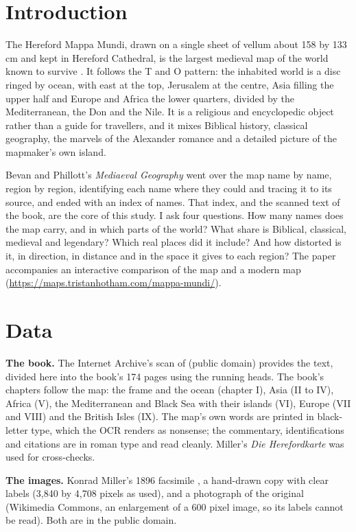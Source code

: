 \documentclass[11pt,a4paper]{article}
\begin{document}
\section{Introduction}
The Hereford Mappa Mundi, drawn on a single sheet of vellum about 158 by 133 cm and kept in Hereford Cathedral, is the largest medieval map of the world known to survive \citep{wiki}. It follows the T and O pattern: the inhabited world is a disc ringed by ocean, with east at the top, Jerusalem at the centre, Asia filling the upper half and Europe and Africa the lower quarters, divided by the Mediterranean, the Don and the Nile. It is a religious and encyclopedic object rather than a guide for travellers, and it mixes Biblical history, classical geography, the marvels of the Alexander romance and a detailed picture of the mapmaker's own island.

Bevan and Phillott's \textit{Mediaeval Geography} \citep{bevan} went over the map name by name, region by region, identifying each name where they could and tracing it to its source, and ended with an index of names. That index, and the scanned text of the book, are the core of this study. I ask four questions. How many names does the map carry, and in which parts of the world? What share is Biblical, classical, medieval and legendary? Which real places did it include? And how distorted is it, in direction, in distance and in the space it gives to each region? The paper accompanies an interactive comparison of the map and a modern map (\url{https://maps.tristanhotham.com/mappa-mundi/}).

\section{Data}
\textbf{The book.} The Internet Archive's scan of \citet{bevan} (public domain) provides the text, divided here into the book's 174 pages using the running heads. The book's chapters follow the map: the frame and the ocean (chapter I), Asia (II to IV), Africa (V), the Mediterranean and Black Sea with their islands (VI), Europe (VII and VIII) and the British Isles (IX). The map's own words are printed in black-letter type, which the OCR renders as nonsense; the commentary, identifications and citations are in roman type and read cleanly. Miller's \textit{Die Herefordkarte} \citep{miller1903} was used for cross-checks.

\textbf{The images.} Konrad Miller's 1896 facsimile \citep{miller1896}, a hand-drawn copy with clear labels (3,840 by 4,708 pixels as used), and a photograph of the original (Wikimedia Commons, an enlargement of a 600 pixel image, so its labels cannot be read). Both are in the public domain.
\end{document}
